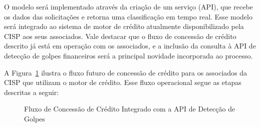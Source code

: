 \documentclass[12pt,a4paper]{article}
\begin{document}
O modelo será implementado através da criação de um serviço (API), que recebe os dados das solicitações e retorna uma classificação em tempo real. Esse modelo será integrado ao sistema de motor de crédito atualmente disponibilizado pela CISP aos seus associados. Vale destacar que o fluxo de concessão de crédito descrito já está em operação com os associados, e a inclusão da consulta à API de detecção de golpes financeiros será a principal novidade incorporada ao processo.

A Figura~\ref{fig:fluxo_credito} ilustra o fluxo futuro de concessão de crédito para os associados da CISP que utilizam o motor de crédito. Esse fluxo operacional segue as etapas descritas a seguir:

\begin{figure}[H]
    \centering
    \caption{Fluxo de Concessão de Crédito Integrado com a API de Detecção de Golpes}
    \label{fig:fluxo_credito}
\end{figure}
\end{document}
